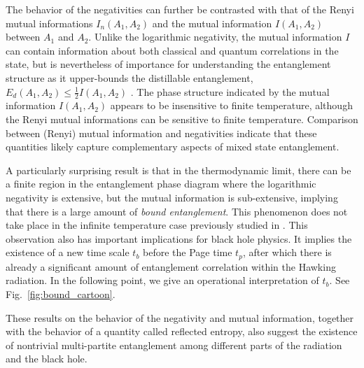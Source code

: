 \documentclass[a4paper,11pt]{article}
\newcommand\half{{\ensuremath{\frac{1}{2}}}}
\newcommand\ha{{\half}}
\begin{document}
The behavior of the negativities can further be contrasted with that of the Renyi mutual informations $I_n (A_1, A_2)$ and the mutual information $I (A_1, A_2)$ between $A_1$ and $A_2$. Unlike the logarithmic negativity, the mutual information $I$ can contain information about both classical and quantum correlations in the state, but is nevertheless of importance for understanding the entanglement structure as it upper-bounds the distillable entanglement, $E_d (A_1, A_2) \leq \ha I (A_1, A_2)$ \cite{2004JMP....45..829C}. 
The phase structure indicated by the mutual information $I (A_1, A_2)$ appears to be insensitive to finite temperature, although the Renyi mutual informations can be sensitive to finite temperature. Comparison between (Renyi) mutual information and negativities indicate that these quantities likely capture complementary aspects of mixed state entanglement. 

A particularly surprising result is that in the thermodynamic limit, there can be a finite region in the entanglement phase diagram where the logarithmic negativity is extensive, but the mutual information is sub-extensive, implying that there is a large amount of \textit{bound entanglement}. This phenomenon does not take place in the infinite temperature case previously studied in \cite{2021PRXQ....2c0347S}. This observation also has important implications for black hole physics. It implies the existence of a new time scale $t_b$ before the Page time $t_p$, after which there is already a significant amount of entanglement correlation 
within the Hawking radiation. In the following point, we give an operational interpretation of $t_b$. See Fig.~\ref{fig:bound_cartoon}. 

These results on the behavior of the negativity and mutual information, together with the behavior of a quantity called reflected entropy, also suggest the existence of nontrivial multi-partite entanglement among different parts of the radiation and the black hole.
 
\end{document}
